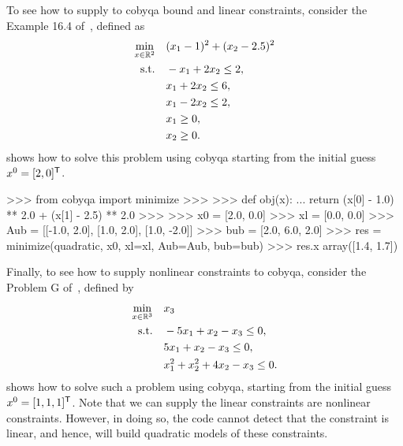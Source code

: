 To see how to supply to \gls{cobyqa} bound and linear constraints, consider the Example 16.4 of~\cite{Nocedal_Wright_2006}, defined as
\begin{align*}
    \min_{\iter \in \R^2}   & \quad (\iter_1 - 1)^2 + (\iter_2 - 2.5)^2\\
    \text{s.t.}             & \quad -\iter_1 + 2 \iter_2 \le 2,\\
                            & \quad \iter_1 + 2 \iter_2 \le 6,\\
                            & \quad \iter_1 - 2 \iter_2 \le 2,\\
                            & \quad \iter_1 \ge 0,\\
                            & \quad \iter_2 \ge 0.
\end{align*}
 shows how to solve this problem using \gls{cobyqa} starting from the initial guess~$\iter[0] = [2, 0]^{\T}$.

\begin{lstpython}[%
    caption=An example of \gls{cobyqa} with linear constraints,
    label=lst:cobyqa-bound-linear,
]
    >>> from cobyqa import minimize
    >>>
    >>> def obj(x):
    ...     return (x[0] - 1.0) ** 2.0 + (x[1] - 2.5) ** 2.0
    >>>
    >>> x0 = [2.0, 0.0]
    >>> xl = [0.0, 0.0]
    >>> Aub = [[-1.0, 2.0], [1.0, 2.0], [1.0, -2.0]]
    >>> bub = [2.0, 6.0, 2.0]
    >>> res = minimize(quadratic, x0, xl=xl, Aub=Aub, bub=bub)
    >>> res.x
    array([1.4, 1.7])
\end{lstpython}

Finally, to see how to supply nonlinear constraints to \gls{cobyqa}, consider the Problem G of~\cite{Powell_1994}, defined by
\begin{align*}
    \min_{\iter \in \R^3}   & \quad \iter_3\\
    \text{s.t.}             & \quad -5 \iter_1 + \iter_2 - \iter_3 \le 0,\\
                            & \quad 5 \iter_1 + \iter_2 - \iter_3 \le 0,\\
                            & \quad \iter_1^2 + \iter_2^2 + 4 \iter_2 - \iter_3 \le 0.
\end{align*}
 shows how to solve such a problem using \gls{cobyqa}, starting from the initial guess~$\iter[0] = [1, 1, 1]^{\T}$.
Note that we can supply the linear constraints are nonlinear constraints.
However, in doing so, the code cannot detect that the constraint is linear, and hence, will build quadratic models of these constraints.

